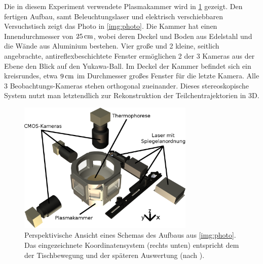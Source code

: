 \documentclass[numbers=noenddot,a4paper]{scrartcl}
\begin{document}
			Die in diesem Experiment verwendete Plasmakammer wird in \ref{img:plasmakammer} gezeigt. Den fertigen Aufbau, samt Beleuchtungslaser und elektrisch verschiebbaren Versuchstisch zeigt das Photo in \ref{img:photo}. Die Kammer hat einen Innendurchmesser von $\unit[25]{cm}$, wobei deren Deckel und Boden aus Edelstahl und die Wände aus Aluminium bestehen. Vier gro{\ss}e und 2 kleine, seitlich angebrachte, antireflexbeschichtete Fenster erm\"oglichen 2 der 3 Kameras aus der Ebene den Blick auf den Yukawa-Ball. Im Deckel der Kammer befindet sich ein kreisrundes, etwa $\unit[9]{cm}$ im Durchmesser gro{\ss}es Fenster f\"ur die letzte Kamera. Alle 3 Beobachtungs-Kameras stehen orthogonal zueinander. Dieses stereoskopische System nutzt man letztendlich zur Rekonstruktion der Teilchentrajektorien in 3D.


       			\begin{figure}[t]
       				\centering
       				\includegraphics[width=0.75\textwidth,height=0.55\textwidth]{figs/witharrowsnunu.png}
       				\caption{Perspektivische Ansicht eines Schemas des Aufbaus aus \ref{img:photo}. Das eingezeichnete Koordinatensystem (rechts unten) entspricht dem der Tischbewegung und der späteren Auswertung (nach \cite{Mulsow13}).}
       				\label{img:plasmakammer}
       			\end{figure}
\end{document}
